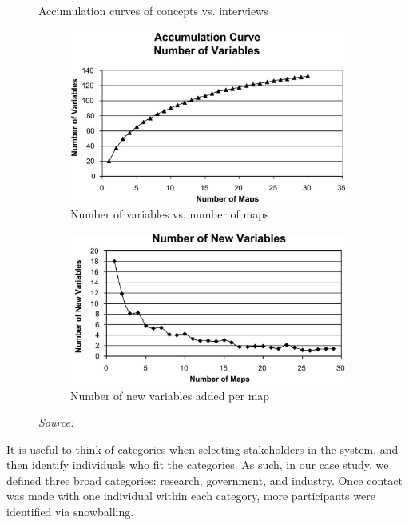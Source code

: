 \begin{figure}[h]
\caption{Accumulation curves of concepts vs. interviews} \label{accumFCM}
\begin{subfigure}[b]{0.45\textwidth}
  \centering
  \includegraphics[width=\textwidth]{fig/numVars.jpg}
\caption{Number of variables vs. number of maps} 
  \label{accumFCM:sub1}
\end{subfigure}%
  \hfill
\begin{subfigure}[b]{0.45\textwidth}
  \centering
  \includegraphics[width=\textwidth]{fig/newVars.jpg}
\caption{Number of new variables added per map}    
  \label{accumFCM:sub2}
\end{subfigure}
\caption*{\textit{Source:} \cite{ozesmi2004ecological}}
\end{figure}

It is useful to think of categories when selecting stakeholders in the system, and then identify individuals who fit the categories. As such, in our case study, we defined three broad categories: research, government, and industry. Once contact was made with one individual within each category, more participants were identified via snowballing. 


